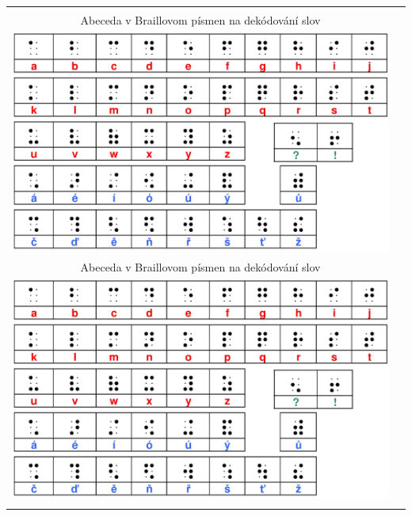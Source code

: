 \documentclass[10pt]{report}
\begin{document}
\clearpage
\setlength{\tabcolsep}{4mm}
\begin{tabular}{c c}
\begin{minipage}{0.47\textwidth}
\begin{center}
\phantom{x}\\[10mm]
{\Large Abeceda v Braillovom písmen na dekódování slov}\\[1mm]
\includegraphics[width=\textwidth]{../images/brailleSkratene.png}
\end{center}
\end{minipage}
&
\begin{minipage}{0.47\textwidth}
\begin{center}
\phantom{x}\\[10mm]
{\Large Abeceda v Braillovom písmen na dekódování slov}\\[1mm]
\includegraphics[width=\textwidth]{../images/brailleSkratene.png}
\end{center}
\end{minipage}
\\
\begin{minipage}{0.47\textwidth}

\end{minipage}
\end{tabular}
\end{document}
